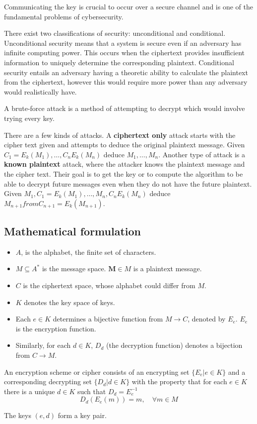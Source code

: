 \documentclass[11pt]{article}
\begin{document}
Communicating the key is crucial to occur over a secure channel and is one of the fundamental problems of cybersecurity.

There exist two classifications of security: unconditional and conditional.
Unconditional security means that a system is secure even if an adversary has infinite computing power.
This occurs when the ciphertext provides insufficient information to uniquely determine the corresponding plaintext.
Conditional security entails an adversary having a theoretic ability to calculate the plaintext from the ciphertext, however this would require more power than any adversary would realistically have.

A brute-force attack is a method of attempting to decrypt which would involve trying every key.

There are a few kinds of attacks.
A \textbf{ciphertext only} attack starts with the cipher text given and attempts to deduce the original plaintext message.
Given $C_1 = E_k (M_1), \dots, C_n E_k (M_n)$ deduce $M_1, \dots, M_n$.
Another type of attack is a \textbf{known plaintext} attack, where the attacker knows the plaintext message and the cipher text.
Their goal is to get the key or to compute the algorithm to be able to decrypt future messages even when they do not have the future plaintext.
Given $M_1, C_1 = E_k (M_1), \dots, M_n, C_n E_k (M_n)$ deduce $M_{n+1} from C_{n+1} = E_k (M_{n+1})$.

\subsection{Mathematical formulation}
\begin{itemize}
    \item $A$, is the alphabet, the finite set of characters.
    \item $M \subseteq A^*$ is the message space. $\textbf{M} \in M $ is a plaintext message.
    \item $C$ is the ciphertext space, whose alphabet could differ from $M$.
    \item $K$ denotes the key space of keys.
    \item Each $e \in K$ determines a bijective function from $M \to C$, denoted by $E_e$. $E_e$ is the encryption function.
    \item Similarly, for each $d \in K$, $D_d$ (the decryption function) denotes a bijection from $C \to M$.
\end{itemize}

An encryption scheme or cipher consists of an encrypting set $\{ E_e | e \in K \}$ and a corresponding decrypting set $ \{ D_d | d \in K \}$ with the property that for each $e \in K$ there is a unique $d \in K$ such that $D_d = E_e^{-1}$
\begin{equation}
    D_d(E_e(m)) = m, \quad \forall m \in M
\end{equation}

The keys $(e,d)$ form a key pair.
\end{document}
